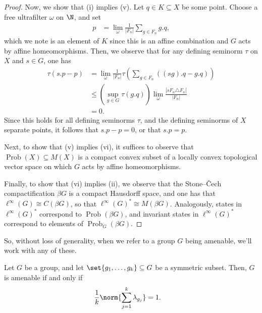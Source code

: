 \documentclass[10pt]{mypackage}
\begin{document}
\begin{proof}
  Now, we show that (i) implies (v). Let $q\in K\subseteq X$ be some point. Choose a free ultrafilter $\omega$ on $\N$, and set
  \begin{align*}
    p &= \lim_{\omega} \frac{1}{\left\vert F_n \right\vert}\sum_{g\in F_n} g.q,
  \end{align*}
  which we note is an element of $K$ since this is an affine combination and $G$ acts by affine homeomorphisms. Then, we observe that for any defining seminorm $\tau$ on $X$ and $s\in G$, one has
  \begin{align*}
    \tau\left( s.p-p \right) &= \lim_{\omega}\frac{1}{\left\vert F_n \right\vert}\tau\left( \sum_{g\in F_n}\left( (sg).q-g.q \right) \right)\\
                             &\leq \left( \sup_{g\in G} \tau\left( g.q \right) \right)\lim_{\omega}\frac{\left\vert sF_n\triangle F_n \right\vert}{\left\vert F_n \right\vert}\\
                             &= 0.
  \end{align*}
  Since this holds for all defining seminorms $\tau$, and the defining seminorms of $X$ separate points, it follows that $s.p-p = 0$, or that $s.p = p$.

  Next, to show that (v) implies (vi), it suffices to observe that $\operatorname{Prob}(X)\subseteq M(X)$ is a compact convex subset of a locally convex topological vector space on which $G$ acts by affine homeomorphisms.

  Finally, to show that (vi) implies (ii), we observe that the Stone--\v{C}ech compactification $\beta G$ is a compact Hausdorff space, and one has that $\ell^{\infty}\left( G \right)\cong C\left( \beta G \right)$, so that $\ell^{\infty}\left( G \right)^{\ast}\cong M\left( \beta G \right)$. Analogously, states in $\ell^{\infty}\left( G \right)^{\ast}$ correspond to $\operatorname{Prob}\left( \beta G \right)$, and invariant states in $\ell^{\infty}\left( G \right)^{\ast}$ correspond to elements of $\operatorname{Prob}_G\left( \beta G \right)$.
\end{proof}
So, without loss of generality, when we refer to a group $G$ being amenable, we'll work with any of these.
\begin{theorem}
  Let $G$ be a group, and let $\set{g_1,\dots,g_k}\subseteq G$ be a symmetric subset. Then, $G$ is amenable if and only if
  \begin{align*}
    \frac{1}{k}\norm{\sum_{j=1}^{k}\lambda_{g_j}} &= 1.
  \end{align*}
\end{theorem}
\end{document}
